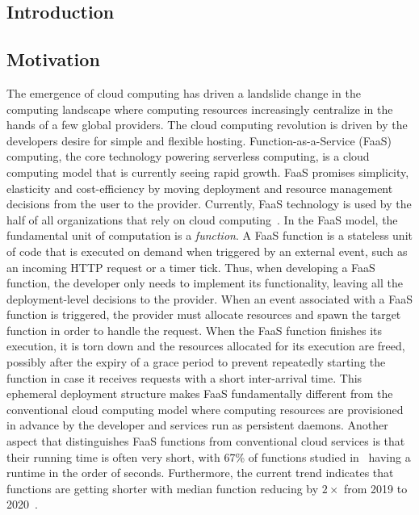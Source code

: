 \documentclass[../main.tex]{subfiles}
\begin{document}
\ifx\chapincluded\undefined
  \begin{refsection}
 \fi

\chapter{Introduction}
\label{chap:intro}

\section{Motivation}

The emergence of cloud computing has driven a landslide change in the
computing landscape where computing resources increasingly centralize
in the hands of a few global providers. The cloud computing revolution
is driven by the developers desire for simple and flexible
hosting. Function-as-a-Service (FaaS) computing, the core technology
powering serverless computing, is a cloud computing model that is
currently seeing rapid growth. FaaS promises simplicity, elasticity
and cost-efficiency by moving deployment and resource management
decisions from the user to the provider. Currently, FaaS technology is
used by the half of all organizations that rely on cloud
computing~\cite{serverless_state}. In the FaaS model, the fundamental
unit of computation is a \emph{function}. A FaaS function is a
stateless unit of code that is executed on demand %
when triggered by an external event,
such as an incoming HTTP request or a
timer tick. Thus, when developing a FaaS function, the developer only
needs to implement its functionality, leaving all
the deployment-level decisions to the provider.
When an event associated with a FaaS function is triggered, the
provider must allocate resources and spawn the target function in
order to handle the request. When the FaaS function finishes its
execution, it is torn down and the resources allocated for its
execution are freed, possibly after the expiry of a grace period to
prevent repeatedly starting the function in case it receives requests
with a short inter-arrival time. This ephemeral deployment structure
makes FaaS fundamentally different from the conventional cloud
computing model where computing resources are provisioned in advance
by the developer and services run as persistent daemons. Another
aspect that distinguishes FaaS functions from conventional cloud
services is that their running time is often very short, with 67\% of
functions studied
in~\cite{eismann20_review_server_use_cases_their_charac} having a
runtime in the order of seconds. Furthermore, the current trend
indicates that functions are getting shorter with median function
reducing by $2\times$ from 2019 to 2020~\cite{serverless_state_21}.



\end{refsection}
\end{document}
